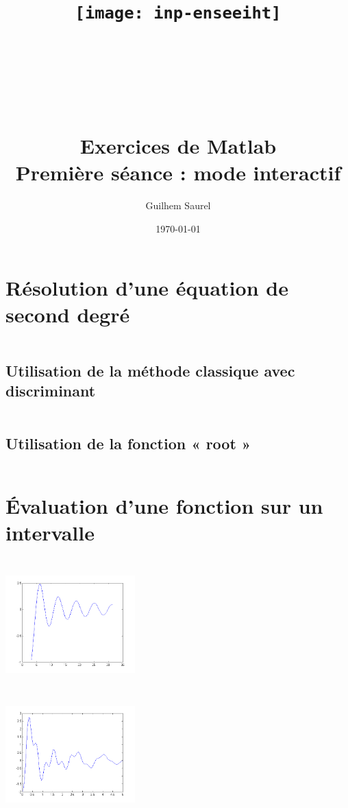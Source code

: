 \documentclass[10pt]{article}
\title{\texttt{[image: inp-enseeiht]} \\ ~ \\ ~ \\ ~ \\ ~ \\ Exercices de Matlab \\ Première séance : mode interactif }
\author{Guilhem Saurel}
\date{\today}
\begin{document}
 \begin{titlepage}
  \maketitle
  \tableofcontents
 \end{titlepage}

 \section{Résolution d’une équation de second degré}
 
  \inputminted[linenos,firstnumber=1,firstline=1,lastline=2]{matlab}{un.m}
  \subsection{Utilisation de la méthode classique avec discriminant}
   \inputminted[linenos,firstnumber=3,firstline=3,lastline=6]{matlab}{un.m}
  \subsection{Utilisation de la fonction « root »}
   \inputminted[linenos,firstnumber=7,firstline=9,lastline=9]{matlab}{un.m}

 \section{Évaluation d’une fonction sur un intervalle}
  \subsection{}
   \inputminted[linenos,firstnumber=10,firstline=10,lastline=13]{matlab}{un.m}
   \includegraphics[width=5cm]{2A}
  \subsection{}
   \inputminted[linenos,firstnumber=14,firstline=14,lastline=17]{matlab}{un.m}
   \includegraphics[width=5cm]{2B}
\end{document}
